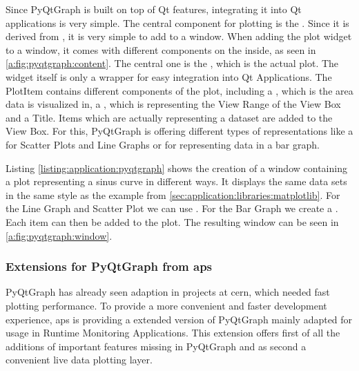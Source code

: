 Since PyQtGraph is built on top of Qt features, integrating it into Qt applications is very simple. The central component for plotting is the . Since it is derived from , it is very simple to add to a window. When adding the plot widget to a window, it comes with different components on the inside, as seen in \ref{a:fig:pyqtgraph:content}. The central one is the , which is the actual plot. The widget itself is only a wrapper for easy integration into Qt Applications. The PlotItem contains different components of the plot, including a , which is the area data is visualized in, a , which is representing the View Range of the View Box and a Title. Items which are actually representing a dataset are added to the View Box. For this, PyQtGraph is offering different types of representations like a  for Scatter Plots and Line Graphs or  for representing data in a bar graph.

Listing \ref{listing:application:pyqtgraph} shows the creation of a window containing a plot representing a sinus curve in different ways. It displays the same data sets in the same style as the example from \ref{sec:application:libraries:matplotlib}. For the Line Graph and Scatter Plot we can use . For the Bar Graph we create a . Each item can then be added to the plot. The resulting window can be seen in \ref{a:fig:pyqtgraph:window}.
\cite{PyQtGraphDoc}



\subsubsection{Extensions for PyQtGraph from \gls{aps}}
\label{sec:application:libraries:accpyqtgraph}
PyQtGraph has already seen adaption in projects at \gls{cern}, which needed fast plotting performance. To provide a more convenient and faster development experience, \gls{aps} is providing a extended version of PyQtGraph mainly adapted for usage in Runtime Monitoring Applications. This extension offers first of all the additions of important features missing in PyQtGraph and as second a convenient live data plotting layer.

